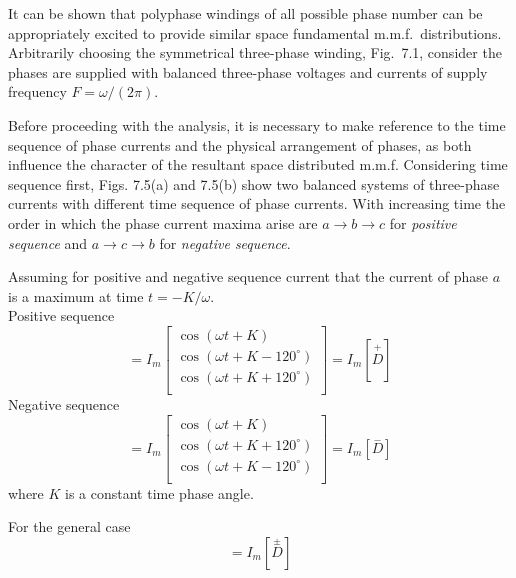 \documentclass[a4paper,numbers=noenddot,12pt]{scrbook}
\begin{document}
    It can be shown that polyphase windings of all possible phase number can be appropriately excited to provide similar space fundamental m.m.f.\ distributions. Arbitrarily choosing the symmetrical three-phase winding, Fig.\ 7.1, consider the phases are supplied with balanced three-phase voltages and currents of supply frequency $F = \omega /(2\pi)$.

    Before proceeding with the analysis, it is necessary to make reference to the time sequence of phase currents and the physical arrangement of phases, as both influence the character of the resultant space distributed m.m.f. Considering time sequence first, Figs. 7.5(a) and 7.5(b) show two balanced systems of three-phase currents with different time sequence of phase currents. With increasing time the order in which the phase current maxima arise are $a \rightarrow b \rightarrow c$ for \textit{positive
    sequence}  and $a \rightarrow c \rightarrow b$ for \textit{negative sequence}.

    Assuming for positive and negative sequence current that the current of phase $a$ is a maximum at time $t = -K/\omega$.\\
    Positive sequence
    \begin{equation}
        [i_{abc}] = I_m
        \begin{bmatrix}
            \cos (\omega t + K)\\
            \cos (\omega t + K - 120^{\circ}) \\
            \cos (\omega t + K + 120^{\circ}) \\
        \end{bmatrix}
        =
        I_m[\overset{+}{D}]
        \label{eq:Eq7.76}
    \end{equation}
    Negative sequence
    \begin{equation}
        [i_{abc}] = I_m
        \begin{bmatrix}
            \cos (\omega t + K)\\
            \cos (\omega t + K + 120^{\circ}) \\
            \cos (\omega t + K - 120^{\circ}) \\
        \end{bmatrix}
        =
        I_m[\overset{-}{D}]
        \label{eq:Eq7.77}
    \end{equation}
    where $K$ is a constant time phase angle.

    For the general case
    \begin{equation}
        [i_{abc}] = I_m[\overset{\pm}{D}]
        \label{eq:Eq7.78}
    \end{equation}
\end{document}
